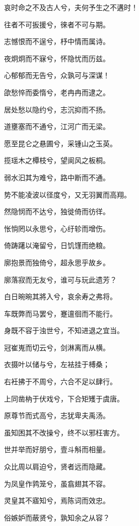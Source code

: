 \documentclass[UTF8,titlepage,oneside]{ctexbook}
\begin{document}
\begin{center}
    
    哀时命之不及古人兮，夫何予生之不遘时！
    
    往者不可扳援兮，徠者不可与期。
    
    志憾恨而不逞兮，杼中情而属诗。
    
    夜炯炯而不寐兮，怀隐忧而历兹。
    
    心郁郁而无告兮，众孰可与深谋！
    
    欿愁悴而委惰兮，老冉冉而逮之。
    
    居处愁以隐约兮，志沉抑而不扬。
    
    道壅塞而不通兮，江河广而无梁。
    
    愿至昆仑之悬圃兮，采锺山之玉英。
    
    揽瑶木之橝枝兮，望阆风之板桐。
    
    弱水汩其为难兮，路中断而不通。
    
    势不能凌波以径度兮，又无羽翼而高翔。
    
    然隐悯而不达兮，独徙倚而彷徉。
    
    怅惝罔以永思兮，心纡轸而增伤。
    
    倚踌躇以淹留兮，日饥馑而绝粮。
    
    廓抱景而独倚兮，超永思乎故乡。
    
    廓落寂而无友兮，谁可与玩此遗芳？
    
    白日晼晼其將入兮，哀余寿之弗将。
    
    车既弊而马罢兮，蹇邅徊而不能行。
    
    身既不容于浊世兮，不知进退之宜当。
    
    冠崔嵬而切云兮，剑淋离而从横。
    
    衣摄叶以储与兮，左袪挂于榑桑；
    
    右衽拂于不周兮，六合不足以肆行。
    
    上同凿枘于伏戏兮，下合矩矱于虞唐。
    
    原尊节而式高兮，志犹卑夫禹汤。
    
    虽知困其不改操兮，终不以邪枉害方。
    
    世并举而好朋兮，壹斗斛而相量。
    
    众比周以肩迫兮，贤者远而隐藏。
    
    为凤皇作鹑笼兮，虽翕翅其不容。
    
    灵皇其不寤知兮，焉陈词而效忠。
    
    俗嫉妒而蔽贤兮，孰知余之从容？
    

\end{center}
\end{document}

